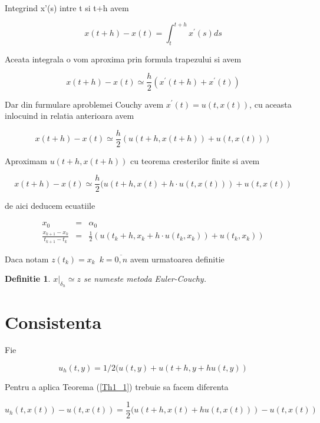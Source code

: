 \documentclass[a4paper,twoside]{book}
\newtheorem{definition}[theorem]{Definitie}
\begin{document}
Integrind x'(s) intre t si t+h avem

\begin{equation*}
x(t+h)-x(t)=\int_{t}^{t+h}x^{\prime }(s)ds
\end{equation*}

Aceata integrala o vom aproxima prin formula trapezului si avem

\begin{equation*}
x(t+h)-x(t)\simeq \frac{h}{2}(x^{\prime }(t+h)+x^{\prime }(t))
\end{equation*}

Dar din furmulare aproblemei Couchy avem $x^{\prime }(t)=u(t,x(t))$, cu
aceasta inlocuind in relatia anterioara avem

\begin{equation*}
x(t+h)-x(t)\simeq \frac{h}{2}(u(t+h,x(t+h))+u(t,x(t)))
\end{equation*}

Aproximam $u(t+h,x(t+h))$ cu teorema cresterilor finite si avem

\begin{equation*}
x(t+h)-x(t)\simeq \frac{h}{2}(u(t+h,x(t)+h\cdot u(t,x(t)))+u(t,x(t))
\end{equation*}

de aici deducem ecuatiile

\begin{eqnarray*}
x_{0} &=&\alpha _{0} \\
\frac{x_{k+1}-x_{k}}{t_{k+1}-t_{k}} &=&\frac{1}{2}(u(t_{k}+h,x_{k}+h\cdot
u(t_{k},x_{k}))+u(t_{k},x_{k}))
\end{eqnarray*}

Daca notam $z(t_{k})=x_{k}\,\,\,k=\overline{0,n}$ avem urmatoarea definitie

\begin{definition}
$x|_{\delta _{h}}\simeq z$ se numeste metoda Euler-Couchy.
\end{definition}

\section{Consistenta}

Fie

\begin{equation*}
u_{h}(t,y)=1/2(u(t,y)+u(t+h,y+hu(t,y))
\end{equation*}

Pentru a aplica Teorema (\ref{Th1_1}) trebuie sa facem diferenta

\begin{equation*}
u_{h}(t,x(t))-u(t,x(t))=\frac{1}{2}(u(t+h,x(t)+hu(t,x(t)))-u(t,x(t))
\end{equation*}
\end{document}
